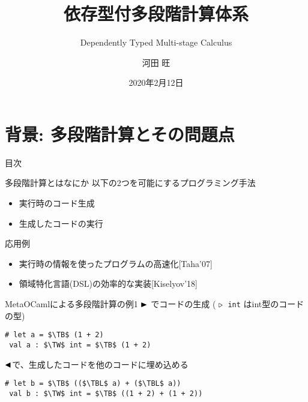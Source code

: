 \documentclass[dvipdfmx,aspectratio=169, 20pt]{beamer}
\title{依存型付多段階計算体系}
\subtitle{Dependently Typed Multi-stage Calculus}
\author{河田 旺}
\institute{五十嵐・末永研究室}
\date{2020年2月12日}
\begin{document}
\maketitle



\section{背景: 多段階計算とその問題点}

%
%

\begin{frame}{目次}
    \tableofcontents[currentsection]
\end{frame}

\begin{frame}[fragile]{多段階計算とはなにか}
    以下の2つを可能にするプログラミング手法
    \begin{itemize}
        \item 実行時のコード生成
        \item 生成したコードの実行
    \end{itemize}
    応用例
    \begin{itemize}
        \item 実行時の情報を使ったプログラムの高速化[Taha'07]
        \item 領域特化言語(DSL)の効率的な実装[Kiselyov'18]
    \end{itemize}
\end{frame}

\begin{frame}[fragile]{MetaOCamlによる多段階計算の例1}
    \( {\mathop{\blacktriangleright}} \) でコードの生成 ( \( {\mathop{\triangleright}} \)\ \verb|int| はint型のコードの型)
    \begin{exampleblock}{}
        \begin{Verbatim}[commandchars=\\\{\},codes={\catcode`$=3\catcode`^=7}]
 # let a = $\TB$ (1 + 2)
 val a : $\TW$ int = $\TB$ (1 + 2)
        \end{Verbatim}
    \end{exampleblock}
    \( {\mathop{\blacktriangleleft}} \)で、生成したコードを他のコードに埋め込める
    \begin{exampleblock}{}
        \begin{Verbatim}[commandchars=\\\{\},codes={\catcode`$=3\catcode`^=7}]
 # let b = $\TB$ (($\TBL$ a) + ($\TBL$ a))
 val b : $\TW$ int = $\TB$ ((1 + 2) + (1 + 2))
        \end{Verbatim}
    \end{exampleblock}
\end{frame}
\end{document}
